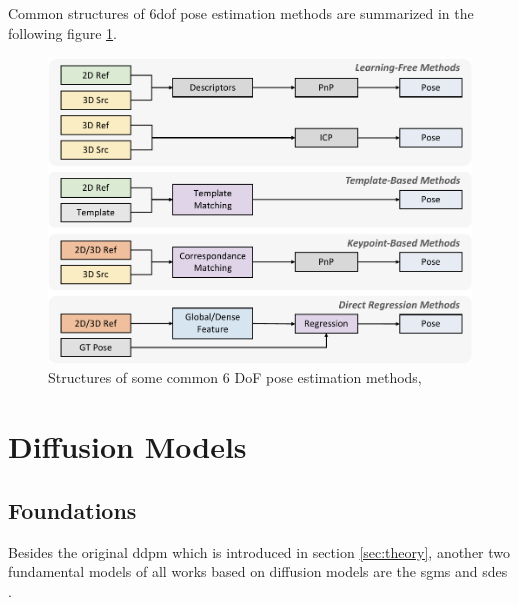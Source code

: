\documentclass[12pt,DIV14,BCOR12mm,a4paper,footinclude=false,headinclude,parskip=half-,twoside,openright,cleardoublepage=empty,toc=index,bibliography=totoc,listof=totoc]{scrreprt}
\numberwithin{equation}{chapter}
\begin{document}
Common structures of \gls{6dof} pose estimation methods are summarized in the following figure \ref{img:pose_methods}.
\begin{figure}[h]
	\centering
	\includegraphics[width=1.\textwidth]{img/pose_methods.pdf}
	\caption{Structures of some common 6 DoF pose estimation methods,}
	\label{img:pose_methods}
\end{figure}

\section{Diffusion Models}
\subsection{Foundations}
Besides the original \gls{ddpm} \cite{sohldickstein2015deep,ho2020denoising} which is introduced in section \ref{sec:theory}, another two fundamental models of all works based on diffusion models are the \glspl{sgm} \cite{song2020generative,song2020improved} and \glspl{sde} \cite{song2021maximum,song2021scorebased}.
\end{document}
